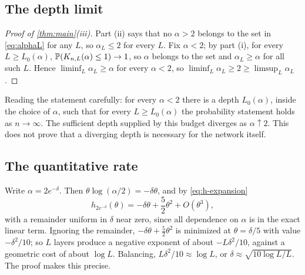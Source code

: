 \subsection{The depth limit}

\begin{proof}[Proof of \cref{thm:main}(iii)]
Part (ii) says that no $\alpha>2$ belongs to the set in \cref{eq:alphaL} for any $L$, so $\alpha_L\le2$ for every $L$. Fix $\alpha<2$; by part (i), for every $L\ge L_0(\alpha)$, $\mathbb{P}(K_{n,L}(\alpha)\le1)\to1$, so $\alpha$ belongs to the set and $\alpha_L\ge\alpha$ for all such $L$. Hence $\liminf_L\alpha_L\ge\alpha$ for every $\alpha<2$, so $\liminf_L\alpha_L\ge2\ge\limsup_L\alpha_L$.
\end{proof}

Reading the statement carefully: for every $\alpha<2$ there is a depth $L_0(\alpha)$, inside the choice of $\alpha$, such that for every $L\ge L_0(\alpha)$ the probability statement holds as $n\to\infty$. The sufficient depth supplied by this budget diverges as $\alpha\uparrow2$. This does not prove that a diverging depth is necessary for the network itself.

\subsection{The quantitative rate}

Write $\alpha=2e^{-\delta}$. Then $\theta\log(\alpha/2)=-\delta\theta$, and by \cref{eq:h-expansion}
\begin{equation}\label{eq:h-delta}
h_{2e^{-\delta}}(\theta)=-\delta\theta+\frac52\theta^2+O(\theta^3),
\end{equation}
with a remainder uniform in $\delta$ near zero, since all dependence on $\alpha$ is in the exact linear term. Ignoring the remainder, $-\delta\theta+\frac52\theta^2$ is minimized at $\theta=\delta/5$ with value $-\delta^2/10$; so $L$ layers produce a negative exponent of about $-L\delta^2/10$, against a geometric cost of about $\log L$. Balancing, $L\delta^2/10\approx\log L$, or $\delta\approx\sqrt{10\log L/L}$. The proof makes this precise.

